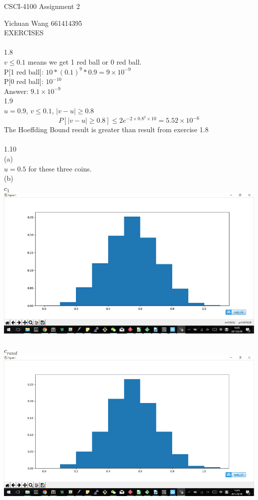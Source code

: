 \documentclass[12pt]{article}
\begin{document}
CSCI-4100 Assignment 2

Yichuan Wang 661414395\\
EXERCISES\\\\
1.8\\ %
$v \leq 0.1$ means we get 1 red ball or 0 red ball. \\
P[1 red ball]: $10*(0.1)^9*0.9 = 9\times10^{-9}$\\
P[0 red ball]: $10^{-10}$\\
Answer: $9.1\times 10^{-9}$\\
1.9\\ %
$u=0.9$, $v\leq0.1$, $|v-u|\geq0.8$
	$$P[|v-u|\geq0.8]\leq2e^{-2\times{0.8^2}\times10} = 5.52\times10^{-6}$$
The Hoeffding Bound result is greater than result from exercise 1.8\\\\
1.10\\
(a)\\%
$u=0.5$ for these three coins.\\
(b)\\%
$c_1$\\%
\includegraphics[scale=0.6]{c_1}\\\\
$c_{rand}$\\%
\includegraphics[scale=0.6]{c_rand}\\\\
\end{document}
